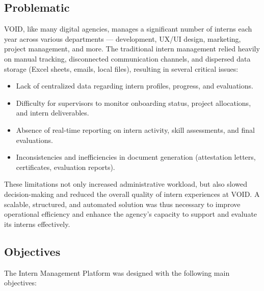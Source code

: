\subsection{Problematic}
\noindent
VOID, like many digital agencies, manages a significant number of interns each year across various departments — development, UX/UI design, marketing, project management, and more.  
The traditional intern management relied heavily on manual tracking, disconnected communication channels, and dispersed data storage (Excel sheets, emails, local files), resulting in several critical issues:
\begin{itemize}
  \item Lack of centralized data regarding intern profiles, progress, and evaluations.
  \item Difficulty for supervisors to monitor onboarding status, project allocations, and intern deliverables.
  \item Absence of real-time reporting on intern activity, skill assessments, and final evaluations.
  \item Inconsistencies and inefficiencies in document generation (attestation letters, certificates, evaluation reports).
\end{itemize}

\medskip

\noindent
These limitations not only increased administrative workload, but also slowed decision-making and reduced the overall quality of intern experiences at VOID.  
A scalable, structured, and automated solution was thus necessary to improve operational efficiency and enhance the agency's capacity to support and evaluate its interns effectively.

\medskip

\subsection{Objectives}
\noindent
The Intern Management Platform was designed with the following main objectives:

